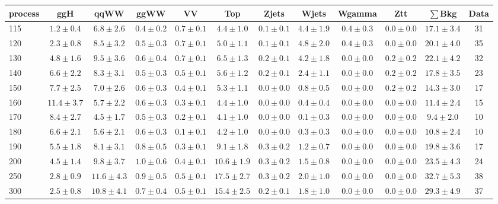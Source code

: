 \begin{table}[!hb]
{\footnotesize
 \begin{center}
 \begin{tabular}{l c c c c c c c c c c c }
 \hline
 process & ggH & qqWW & ggWW & VV & Top & Zjets & Wjets & Wgamma & Ztt & $\sum$Bkg & Data \\
 \hline
115 & $1.2\pm0.4$ & $6.8\pm2.6$ & $0.4\pm0.2$ & $0.7\pm0.1$ & $4.4\pm1.0$ & $0.1\pm0.1$ & $4.4\pm1.9$ & $0.4\pm0.3$ & $0.0\pm0.0$ & $17.1\pm3.4$ & 31 \\
120 & $2.3\pm0.8$ & $8.5\pm3.2$ & $0.5\pm0.3$ & $0.7\pm0.1$ & $5.0\pm1.1$ & $0.1\pm0.1$ & $4.8\pm2.0$ & $0.4\pm0.3$ & $0.0\pm0.0$ & $20.1\pm4.0$ & 35 \\
130 & $4.8\pm1.6$ & $9.5\pm3.6$ & $0.6\pm0.4$ & $0.7\pm0.1$ & $6.5\pm1.3$ & $0.2\pm0.1$ & $4.2\pm1.8$ & $0.0\pm0.0$ & $0.2\pm0.2$ & $22.1\pm4.2$ & 32 \\
140 & $6.6\pm2.2$ & $8.3\pm3.1$ & $0.5\pm0.3$ & $0.5\pm0.1$ & $5.6\pm1.2$ & $0.2\pm0.1$ & $2.4\pm1.1$ & $0.0\pm0.0$ & $0.2\pm0.2$ & $17.8\pm3.5$ & 23 \\
150 & $7.7\pm2.5$ & $7.0\pm2.6$ & $0.6\pm0.3$ & $0.4\pm0.1$ & $5.3\pm1.1$ & $0.0\pm0.0$ & $0.8\pm0.5$ & $0.0\pm0.0$ & $0.2\pm0.2$ & $14.3\pm3.0$ & 17 \\
160 & $11.4\pm3.7$ & $5.7\pm2.2$ & $0.6\pm0.3$ & $0.3\pm0.1$ & $4.4\pm1.0$ & $0.0\pm0.0$ & $0.4\pm0.4$ & $0.0\pm0.0$ & $0.0\pm0.0$ & $11.4\pm2.4$ & 15 \\
170 & $8.4\pm2.7$ & $4.5\pm1.7$ & $0.5\pm0.3$ & $0.2\pm0.1$ & $4.1\pm1.0$ & $0.0\pm0.0$ & $0.1\pm0.3$ & $0.0\pm0.0$ & $0.0\pm0.0$ & $9.4\pm2.0$ & 10 \\
180 & $6.6\pm2.1$ & $5.6\pm2.1$ & $0.6\pm0.3$ & $0.1\pm0.1$ & $4.2\pm1.0$ & $0.0\pm0.0$ & $0.3\pm0.3$ & $0.0\pm0.0$ & $0.0\pm0.0$ & $10.8\pm2.4$ & 10 \\
190 & $5.5\pm1.8$ & $8.1\pm3.1$ & $0.8\pm0.5$ & $0.3\pm0.1$ & $9.1\pm1.8$ & $0.3\pm0.2$ & $1.2\pm0.7$ & $0.0\pm0.0$ & $0.0\pm0.0$ & $19.8\pm3.6$ & 17 \\
200 & $4.5\pm1.4$ & $9.8\pm3.7$ & $1.0\pm0.6$ & $0.4\pm0.1$ & $10.6\pm1.9$ & $0.3\pm0.2$ & $1.5\pm0.8$ & $0.0\pm0.0$ & $0.0\pm0.0$ & $23.5\pm4.3$ & 24 \\
250 & $2.8\pm0.9$ & $11.6\pm4.3$ & $0.9\pm0.5$ & $0.5\pm0.1$ & $17.5\pm2.7$ & $0.3\pm0.2$ & $2.0\pm1.0$ & $0.0\pm0.0$ & $0.0\pm0.0$ & $32.7\pm5.3$ & 38 \\
300 & $2.5\pm0.8$ & $10.8\pm4.1$ & $0.7\pm0.4$ & $0.5\pm0.1$ & $15.4\pm2.5$ & $0.2\pm0.1$ & $1.8\pm1.0$ & $0.0\pm0.0$ & $0.0\pm0.0$ & $29.3\pm4.9$ & 37 \\

\end{tabular}
\end{center}}
\end{table}

